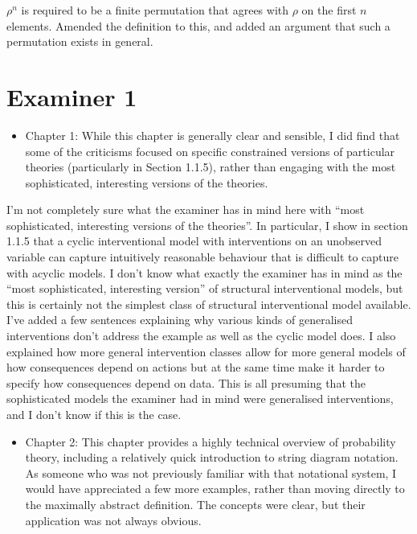 \documentclass[12pt, a4paper]{article}
\begin{document}
$\rho^n$ is required to be a finite permutation that agrees with $\rho$ on the first $n$ elements. Amended the definition to this, and added an argument that such a permutation exists in general.


\section{Examiner 1}

\begin{itemize}
    \item Chapter 1: While this chapter is generally clear and sensible, I did find that some of the criticisms focused on specific constrained versions of particular theories (particularly in Section 1.1.5), rather than engaging with the most sophisticated, interesting versions of the theories.
\end{itemize}

I'm not completely sure what the examiner has in mind here with ``most sophisticated, interesting versions of the theories''. In particular, I show in section 1.1.5 that a cyclic interventional model with interventions on an unobserved variable can capture intuitively reasonable behaviour that is difficult to capture with acyclic models. I don't know what exactly the examiner has in mind as the ``most sophisticated, interesting version'' of structural interventional models, but this is certainly not the simplest class of structural interventional model available. I've added a few sentences explaining why various kinds of generalised interventions don't address the example as well as the cyclic model does. I also explained how more general intervention classes allow for more general models of how consequences depend on actions but at the same time make it harder to specify how consequences depend on data. This is all presuming that the sophisticated models the examiner had in mind were generalised interventions, and I don't know if this is the case.

\begin{itemize}
    \item Chapter 2: This chapter provides a highly technical overview of probability theory, including a relatively quick introduction to string diagram notation. As someone who was not previously familiar with that notational system, I would have appreciated a few more examples, rather than moving directly to the maximally abstract definition. The concepts were clear, but their application was not always obvious.
\end{itemize}
\end{document}
